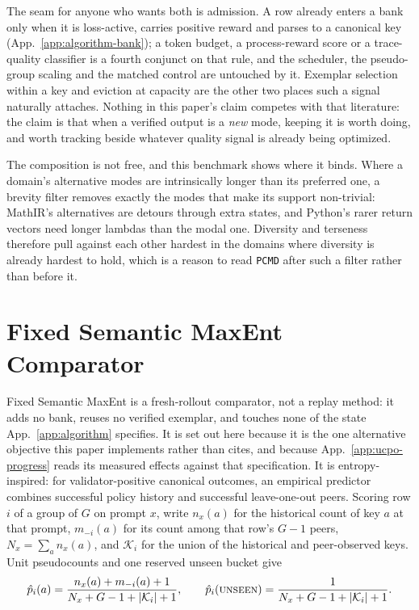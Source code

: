 \documentclass{article}
\newcommand{\1}{\mathbf 1}
\newcommand{\pmd}{\texttt{PCMD}}
\theoremstyle{remark}
\theoremstyle{definition}
\theoremstyle{plain}
\begin{document}
The seam for anyone who wants both is admission. A row already enters a bank
only when it is loss-active, carries positive reward and parses to a canonical
key (App.~\ref{app:algorithm-bank}); a token budget, a process-reward score or
a trace-quality classifier is a fourth conjunct on that rule, and the
scheduler, the pseudo-group scaling and the matched control are untouched by
it. Exemplar selection within a key and eviction at capacity are the other two
places such a signal naturally attaches. Nothing in this paper's claim
competes with that literature: the claim is that when a verified output is a
\emph{new} mode, keeping it is worth doing, and worth tracking beside whatever
quality signal is already being optimized.

The composition is not free, and this benchmark shows where it binds. Where a
domain's alternative modes are intrinsically longer than its preferred one, a
brevity filter removes exactly the modes that make its support non-trivial:
MathIR's alternatives are detours through extra states, and Python's rarer
return vectors
need longer lambdas than the modal one. Diversity and terseness therefore pull
against each other hardest in the domains where diversity is already hardest to
hold, which is a reason to read \pmd{} after such a filter rather than before
it.

\section{Fixed Semantic MaxEnt Comparator}
\label{app:semantic-maxent}

Fixed Semantic MaxEnt is a fresh-rollout comparator, not a replay method: it
adds no bank, reuses no verified exemplar, and touches none of the state
App.~\ref{app:algorithm} specifies. It is set out here because it is the one
alternative objective this paper implements rather than cites, and because
App.~\ref{app:ucpo-progress} reads its measured effects against that
specification. It is entropy-inspired: for validator-positive canonical
outcomes, an empirical predictor combines successful policy history and
successful leave-one-out peers. Scoring row $i$ of a group of $G$ on prompt
$x$, write $n_x(a)$ for the historical count of key $a$ at that prompt,
$m_{-i}(a)$ for its count among that row's $G-1$ peers,
$N_x=\sum_a n_x(a)$, and $\mathcal K_i$ for the union of the historical and
peer-observed keys. Unit pseudocounts and one reserved unseen bucket give
\begin{equation}
  \hat p_i(a)=\frac{n_x(a)+m_{-i}(a)+1}{N_x+G-1+|\mathcal K_i|+1},\qquad
  \hat p_i(\textsc{unseen})=\frac{1}{N_x+G-1+|\mathcal K_i|+1}.
  \label{eq:open-set-predictor}
\end{equation}
\end{document}
